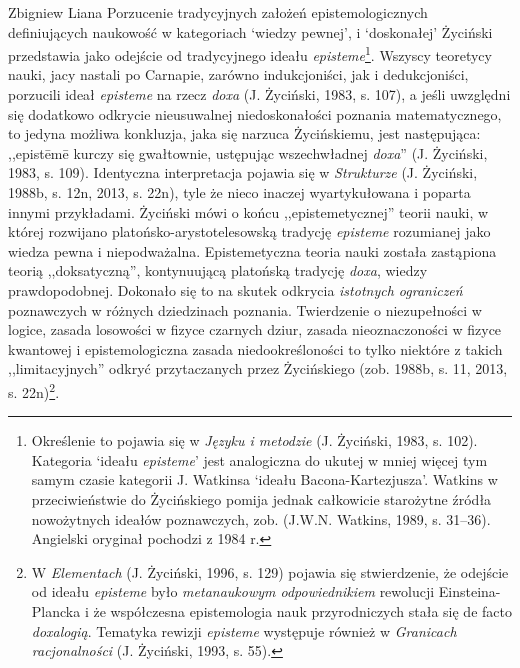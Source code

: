 \begin{artplenv}{Zbigniew Liana}
Porzucenie tradycyjnych założeń epistemologicznych definiujących naukowość w kategoriach ‘wiedzy pewnej’, i ‘doskonałej’
Życiński przedstawia jako odejście od tradycyjnego ideału \textit{episteme}\footnote{Określenie to pojawia się w
	\textit{Języku i metodzie} \label{ref:RNDVZe2UQr77Q}(J. Życiński, 1983, s. 102). Kategoria ‘ideału\textit{ episteme}’ jest
	analogiczna do ukutej w mniej więcej tym samym czasie kategorii J. Watkinsa ‘ideału Bacona-Kartezjusza’. Watkins w
	przeciwieństwie do Życińskiego pomija jednak całkowicie starożytne źródła nowożytnych ideałów poznawczych, zob.
	\label{ref:RNDFZ4rQltK9B}(J.W.N. Watkins, 1989, s. 31–36). Angielski oryginał pochodzi z 1984 r.}. Wszyscy teoretycy
nauki, jacy nastali po Carnapie, zarówno indukcjoniści, jak i dedukcjoniści, porzucili ideał \textit{episteme }na rzecz
\textit{doxa} \label{ref:RNDFYiS161msr}(J. Życiński, 1983, s. 107), a jeśli uwzględni się dodatkowo odkrycie nieusuwalnej
niedoskonałości poznania matematycznego, to jedyna możliwa konkluzja, jaka się narzuca Życińskiemu, jest następująca:
,,epist\=em\=e kurczy się gwałtownie, ustępując wszechwładnej \textit{doxa}'' \label{ref:RND0ssJjiFTXJ}(J. Życiński, 1983,
s. 109). Identyczna interpretacja pojawia się w \textit{Strukturze} \label{ref:RNDOxi36USGCm}(J. Życiński, 1988b, s. 12n,
2013, s. 22n), tyle że nieco inaczej wyartykułowana i poparta innymi przykładami. Życiński mówi o końcu
,,epistemetycznej'' teorii nauki, w której rozwijano platońsko-arystotelesowską tradycję \textit{episteme} rozumianej jako
wiedza pewna i niepodważalna. Epistemetyczna teoria nauki została zastąpiona teorią ,,doksatyczną'', kontynuującą
platońską tradycję \textit{doxa}, wiedzy prawdopodobnej. Dokonało się to na skutek odkrycia \textit{istotnych ograniczeń}
poznawczych w różnych dziedzinach poznania. Twierdzenie o niezupełności w logice, zasada losowości w fizyce czarnych
dziur, zasada nieoznaczoności w fizyce kwantowej i epistemologiczna zasada niedookreśloności to tylko niektóre z takich
,,limitacyjnych'' odkryć przytaczanych przez Życińskiego \label{ref:RNDP7Ju9f9P3l}(zob. 1988b, s. 11, 2013, s.
22n)\footnote{W \textit{Elementach} \label{ref:RNDGof4TZDE7e}(J. Życiński, 1996, s. 129) pojawia się stwierdzenie, że
	odejście od ideału \textit{episteme} było \textit{metanaukowym odpowiednikiem }rewolucji Einsteina-Plancka i że współczesna
	epistemologia nauk przyrodniczych stała się de facto \textit{doxalogią}. Tematyka rewizji \textit{episteme} występuje
	również w \textit{Granicach racjonalności} \label{ref:RNDEK9raCkAFp}(J. Życiński, 1993, s. 55).}.


\end{artplenv}
